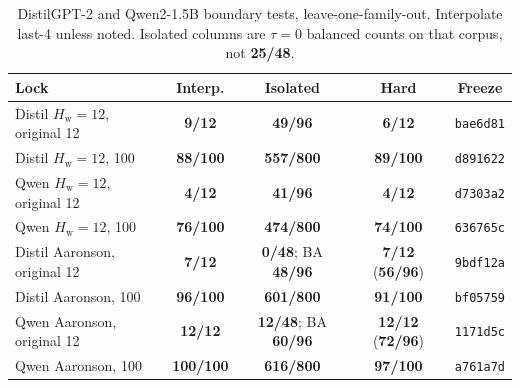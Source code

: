\documentclass[11pt,a4paper]{article}
\theoremstyle{definition}
\newcommand{\Hw}{H_{\mathrm{w}}}
\begin{document}
\begin{table}[ht]
\centering
\scriptsize
\caption{DistilGPT-2 and Qwen2-1.5B boundary tests, leave-one-family-out.
Interpolate last-4 unless noted. Isolated columns are $\tau=0$ balanced
counts on that corpus, not \textbf{25/48}.}
\label{tab:xgen}
\begin{tabular}{@{}lcccc@{}}
\toprule
Lock & Interp. & Isolated & Hard & Freeze \\
\midrule
Distil $\Hw=12$, original 12
  & \textbf{9/12} & \textbf{49/96} & \textbf{6/12} & \texttt{bae6d81} \\
Distil $\Hw=12$, 100
  & \textbf{88/100} & \textbf{557/800} & \textbf{89/100} & \texttt{d891622} \\
Qwen $\Hw=12$, original 12
  & \textbf{4/12} & \textbf{41/96} & \textbf{4/12} & \texttt{d7303a2} \\
Qwen $\Hw=12$, 100
  & \textbf{76/100} & \textbf{474/800} & \textbf{74/100} & \texttt{636765c} \\
Distil Aaronson, original 12
  & \textbf{7/12} & \textbf{0/48}; BA \textbf{48/96} & \textbf{7/12}
    (\textbf{56/96}) & \texttt{9bdf12a} \\
Distil Aaronson, 100
  & \textbf{96/100} & \textbf{601/800} & \textbf{91/100} & \texttt{bf05759} \\
Qwen Aaronson, original 12
  & \textbf{12/12} & \textbf{12/48}; BA \textbf{60/96} & \textbf{12/12}
    (\textbf{72/96}) & \texttt{1171d5c} \\
Qwen Aaronson, 100
  & \textbf{100/100} & \textbf{616/800} & \textbf{97/100} & \texttt{a761a7d} \\
\bottomrule
\end{tabular}
\end{table}
\end{document}
